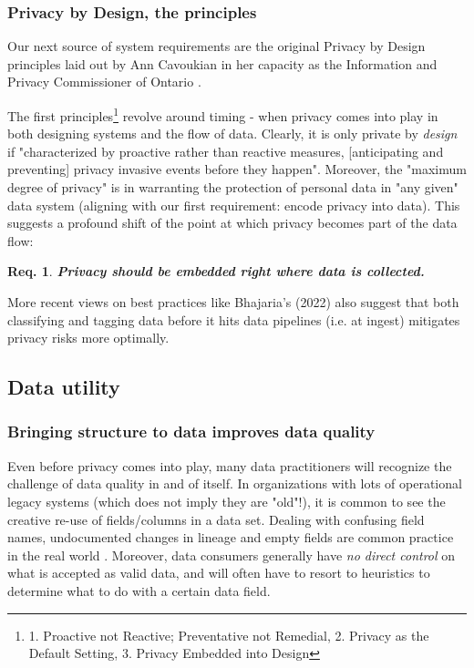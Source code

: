 \documentclass[11pt]{article} %
\newtheorem{requirement}{Req.}
\begin{document}
\subsubsection{Privacy by Design, the principles}
Our next source of system requirements are the original Privacy by Design principles laid out by Ann Cavoukian in her capacity as the Information and Privacy Commissioner of Ontario \cite{cavoukian1997}. 

The first principles\footnote{1. Proactive not Reactive; Preventative not Remedial, 2. Privacy as the Default Setting, 3. Privacy Embedded into Design} revolve around timing - when privacy comes into play in both designing systems and the flow of data. Clearly, it is only private by \textit{design} if "characterized by proactive rather than reactive measures, [anticipating and preventing] privacy invasive events before they happen". Moreover, the "maximum degree of privacy" is in warranting the protection of personal data in "any given" data system (aligning with our first requirement: encode privacy into data). This suggests a profound shift of the point at which privacy becomes part of the data flow:
\begin{requirement}
\textit{\textbf{Privacy should be embedded right where data is collected.}}
\end{requirement}

More recent views on best practices like Bhajaria's (2022) \cite{bhajaria2022data} also suggest that both classifying and tagging data before it hits data pipelines (i.e. at ingest) mitigates privacy risks more optimally.  

\subsection{Data utility}
\subsubsection{Bringing structure to data improves data quality}
Even before privacy comes into play, many data practitioners will recognize the challenge of data quality in and of itself. In organizations with lots of operational legacy systems (which does not imply they are "old"!), it is common to see the creative re-use of fields/columns in a data set. Dealing with confusing field names, undocumented changes in lineage and empty fields are common practice in the real world \cite{barhamgi2022special}. Moreover, data consumers generally have \emph{no direct control} on what is accepted as valid data, and will often have to resort to heuristics to determine what to do with a certain data field. 
\end{document}
